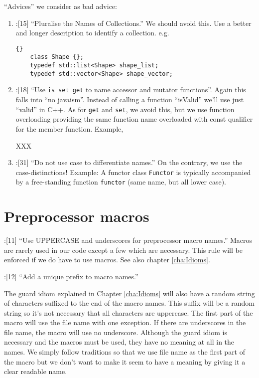 \documentclass{book}
\newcommand{\name}[1]{\texttt{#1}}
\begin{document}
``Advices'' we consider as bad advice:
\begin{enumerate}
\item \cite{OKL_MisfeldtBumgardnerGray2004CppStyle}:[15] ``Pluralise the Names of Collections.'' We should avoid this. Use a better and longer description to identify a collection. e.g.
  \begin{lstlisting}{}
    class Shape {};
    typedef std::list<Shape> shape_list;
    typedef std::vector<Shape> shape_vector; 
  \end{lstlisting}
\item \cite{OKL_MisfeldtBumgardnerGray2004CppStyle}:[18] ``Use \texttt{is set get} to name accessor and mutator functions''. Again this falls into ``no javaism''. Instead of calling a function ``isValid'' we'll use just ``valid'' in C++. As for \texttt{get} and \texttt{set}, we avoid this, but we use function overloading providing the same function name overloaded with const qualifier for the member function. Example,
  
XXX

\item \cite{OKL_MisfeldtBumgardnerGray2004CppStyle}:[31] ``Do not use case to differentiate names.'' On the contrary, we use the case-distinctions! Example: A functor class \name{Functor} is typically accompanied by a free-standing function \name{functor} (same name, but all lower case).
\end{enumerate}




\section{Preprocessor macros}
\label{sec:PreprocessorNames}

\cite{OKL_MisfeldtBumgardnerGray2004CppStyle}:[11] ``Use UPPERCASE and underscores for preprocessor macro names.'' Macros are rarely used in our code except a few which are necessary. This rule will be enforced if we do have to use macros. See also chapter \ref{cha:Idioms}.

\cite{OKL_MisfeldtBumgardnerGray2004CppStyle}:[12] ``Add a unique prefix to macro names.'' 

The guard idiom explained in Chapter \ref{cha:Idioms} will also have a random string of characters suffixed to the end of the macro names. This suffix will be a random string so it's not necessary that all characters are uppercase. The first part of the macro will use the file name with one exception. If there are underscores in the file name, the macro will use no underscore. Although the guard idiom is necessary and the macros must be used, they have no meaning at all in the names. We simply follow traditions so that we use file name as the first part of the macro but we don't want to make it seem to have a meaning by giving it a clear readable name.
\end{document}
